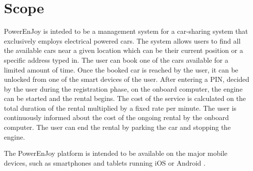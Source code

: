 \section{Scope}
PowerEnJoy is inteded to be a management system for a car-sharing system that exclusively employs electrical powered cars.
The system allows users to find all the available cars near a given location which can be their current position or a specific address typed in. The user can book one of the cars available for a limited amount of time.
Once the booked car is reached by the user, it can be unlocked from one of the smart devices of the user. After entering a PIN, decided by the user during the registration phase, on the onboard computer, the engine can be started and the rental begins.
The cost of the service is calculated on the total duration of the rental multiplied by a fixed rate per minute. The user is continuously informed about the cost of the ongoing rental by the onboard computer.
The user can end the rental by parking the car and stopping the engine.

The PowerEnJoy platform is intended to be available on the major mobile devices, such as smartphones and tablets running iOS \cite{ios} or Android \cite{android}.